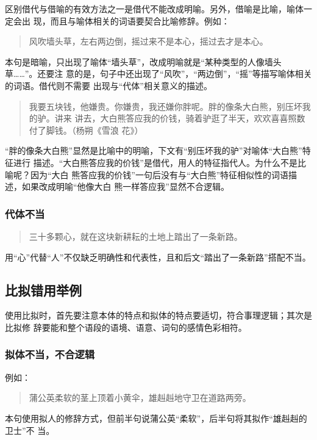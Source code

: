 \documentclass[final,oneside]{ctexbook}
\newenvironment{equotation}{\begin{quotation}\kaishu}{\end{quotation}}
\begin{document}
区别借代与借喻的有效方法之一是借代不能改成明喻。另外，借喻是比喻，喻体一定会出
现，而且与喻体相关的词语要契合比喻修辞。例如：

\begin{equotation}
  风吹墙头草，左右两边倒，摇过来不是本心，摇过去才是本心。
\end{equotation}
本句是暗喻，只出现了喻体“墙头草”，改成明喻就是“某种类型的人像墙头草……”。还要注
意的是，句子中还出现了“风吹”，“两边倒”，“摇”等描写喻体相关的词语。借代则不需要
出现与“代体”相关意义的描述。

\begin{equotation}
  我要五块钱，他嫌贵。你嫌贵，我还嫌你胖呢。胖的像条大白熊，别压坏我的驴。讲来
  讲去，大白熊答应我的价钱，骑着驴逛了半天，欢欢喜喜照数付了脚钱。（杨朔《雪浪
  花》）
\end{equotation}
“胖的像条大白熊”显然是比喻中的明喻，下文有“别压坏我的驴”对喻体“大白熊”特征进行
描述。“大白熊答应我的价钱”是借代，用人的特征指代人。为什么不是比喻呢？因为“大白
熊答应我的价钱”一句后没有与“大白熊”特征相似性的词语描述，如果改成明喻“他像大白
熊一样答应我”显然不合逻辑。

\subsubsection{代体不当}

\begin{equotation}
  三十多颗心，就在这块新耕耘的土地上踏出了一条新路。
\end{equotation}
用“心”代替“人”不仅缺乏明确性和代表性，且和后文“踏出了一条新路”搭配不当。

\subsection{比拟错用举例}

使用比拟时，首先要注意本体的特点和拟体的特点要适切，符合事理逻辑；其次是比拟修
辞要能和整个语段的语境、语意、词句的感情色彩相符。

\subsubsection{拟体不当，不合逻辑}

例如：
\begin{equotation}
  蒲公英柔软的茎上顶着小黄伞，雄赳赳地守卫在道路两旁。
\end{equotation}
本句使用拟人的修辞方式，但前半句说蒲公英“柔软”，后半句将其拟作“雄赳赳的卫士”不
当。
\end{document}

